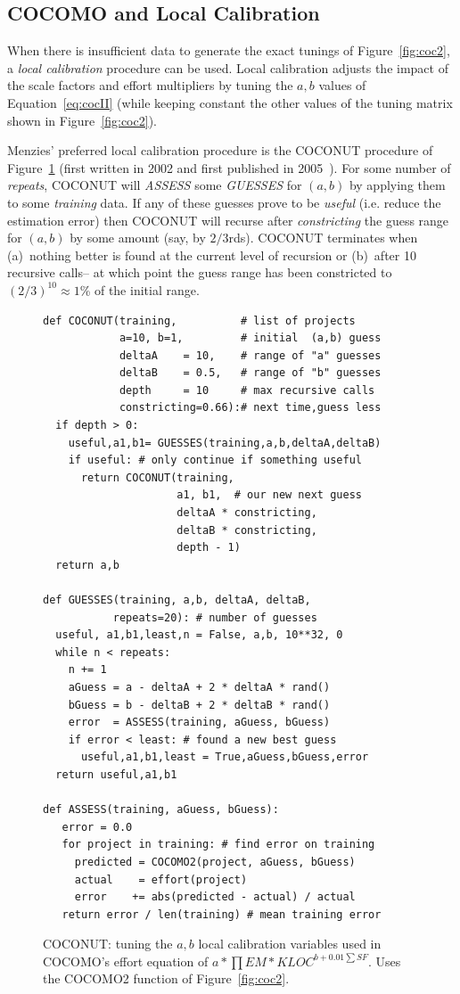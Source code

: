 \documentclass{sig-alternate}
\newcommand{\fig}[1]{Figure~\ref{fig:#1}}
\begin{document}
\subsection{COCOMO and Local Calibration}\label{sect:coconut}
When there is insufficient 
data to generate the exact tunings of \fig{coc2}, 
a {\em local calibration} procedure can be used.
Local calibration adjusts the impact of the scale factors and effort
multipliers by tuning the  $a,b$ values of Equation~\ref{eq:cocII}
(while keeping constant the other values of the tuning matrix
shown in \fig{coc2}).

Menzies' preferred local calibration procedure is the COCONUT
procedure of \fig{coconut} (first written in 2002
and first published in 2005~\cite{me04h}). 
For some number of {\em repeats},
COCONUT will {\em ASSESS} some {\em GUESSES} 
 for $(a,b)$ by applying them to some
{\em training} data. If any of these guesses prove to
be {\em useful} (i.e. reduce the estimation error) then COCONUT will recurse after
{\em constricting} the guess range for $(a,b)$ by some amount (say, by $2/3$rds). COCONUT terminates
when (a)~nothing better is found at the current level of recursion
or (b)~after 10 recursive calls-- at which point the guess range
has been constricted to  $(2/3)^{10}\approx 1$\% of the initial range.


\begin{figure}[!t]
\begin{lstlisting}
def COCONUT(training,          # list of projects
            a=10, b=1,         # initial  (a,b) guess
            deltaA    = 10,    # range of "a" guesses 
            deltaB    = 0.5,   # range of "b" guesses
            depth     = 10     # max recursive calls
            constricting=0.66):# next time,guess less
  if depth > 0:
    useful,a1,b1= GUESSES(training,a,b,deltaA,deltaB)
    if useful: # only continue if something useful
      return COCONUT(training, 
                     a1, b1,  # our new next guess
                     deltaA * constricting,
                     deltaB * constricting,
                     depth - 1)
  return a,b

def GUESSES(training, a,b, deltaA, deltaB,
           repeats=20): # number of guesses
  useful, a1,b1,least,n = False, a,b, 10**32, 0
  while n < repeats:
    n += 1
    aGuess = a - deltaA + 2 * deltaA * rand()
    bGuess = b - deltaB + 2 * deltaB * rand()
    error  = ASSESS(training, aGuess, bGuess)
    if error < least: # found a new best guess
      useful,a1,b1,least = True,aGuess,bGuess,error
  return useful,a1,b1

def ASSESS(training, aGuess, bGuess):
   error = 0.0
   for project in training: # find error on training
     predicted = COCOMO2(project, aGuess, bGuess)
     actual    = effort(project)
     error    += abs(predicted - actual) / actual
   return error / len(training) # mean training error
\end{lstlisting}
\caption{COCONUT: tuning the $a,b$ local calibration variables
used in COCOMO's effort equation of $a*\prod EM *\mathit{KLOC}^{b+0.01\sum SF}$.
Uses the COCOMO2 function of \fig{coc2}.}\label{fig:coconut}
\end{figure}
\end{document}
